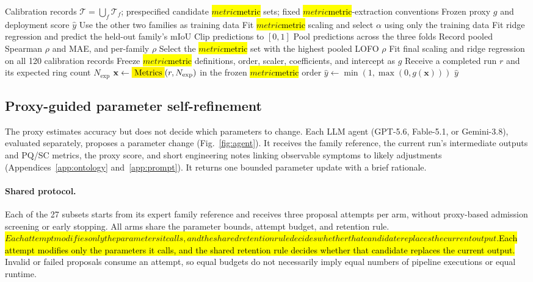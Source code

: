 \documentclass[a4paper,fleqn]{cas-dc}
\let\texthl\hl
\renewcommand{\hl}[1]{\ifmmode\colorbox{yellow}{\ensuremath{#1}}\else\texthl{#1}\fi}
\begin{document}
\begin{algorithm}[ht]
\caption{Proxy calibration and deployment scoring}
\label{alg:proxy}
\begin{algorithmic}[1]
\Require Calibration records $\mathcal{T}=\bigcup_f\mathcal{T}_f$; prespecified candidate \hl{metric} sets; fixed \hl{metric}-extraction conventions
\Ensure Frozen proxy $g$ and deployment score $\hat{y}$
\For{each candidate \hl{metric} set $V$}
        \State Use the other two families as training data
        \State Fit \hl{metric} scaling and select $\alpha$ using only the training data
        \State Fit ridge regression and predict the held-out family's mIoU
        \State Clip predictions to $[0,1]$
    \EndFor
    \State Pool predictions across the three folds
    \State Record pooled Spearman $\rho$ and MAE, and per-family $\rho$
\EndFor
\State Select the \hl{metric} set with the highest pooled LOFO $\rho$
\State Fit final scaling and ridge regression on all 120 calibration records
\State Freeze \hl{metric} definitions, order, scaler, coefficients, and intercept as $g$
\Statex
\State Receive a completed run $r$ and its expected ring count $N_{\mathrm{exp}}$
\State $\mathbf{x}\gets\hl{\operatorname{Metrics}}(r,N_{\mathrm{exp}})$ in the frozen \hl{metric} order
\State $\hat{y}\gets\min(1,\max(0,g(\mathbf{x})))$
\State \Return $\hat{y}$
\end{algorithmic}
\end{algorithm}


\subsection{Proxy-guided parameter self-refinement}
\label{sec:agent-design}

The proxy estimates accuracy but does not decide which parameters to change. Each LLM agent (GPT-5.6, Fable-5.1, or Gemini-3.8), evaluated separately, proposes a parameter change (Fig.~\ref{fig:agent}). It receives the family reference, the current run's intermediate outputs and PQ/SC metrics, the proxy score, and short engineering notes linking observable symptoms to likely adjustments (Appendices~\ref{app:ontology} and~\ref{app:prompt}). It returns one bounded parameter update with a brief rationale.

\paragraph{Shared protocol.}
Each of the 27 subsets starts from its expert family reference and receives three proposal attempts per arm, without proxy-based admission screening or early stopping. All arms share the parameter bounds, attempt budget, and retention rule. \hl{Each attempt modifies only the parameters it calls, and the shared retention rule decides whether that candidate replaces the current output. } Invalid or failed proposals consume an attempt, so equal budgets do not necessarily imply equal numbers of pipeline executions or equal runtime.
\end{document}
